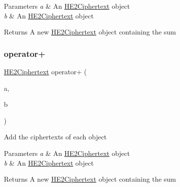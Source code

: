 \begin{DoxyParams}{Parameters}
{\em a} & An {\ttfamily \hyperlink{classHE2Ciphertext}{H\+E2\+Ciphertext}} object \\
\hline
{\em b} & An {\ttfamily \hyperlink{classHE2Ciphertext}{H\+E2\+Ciphertext}} object \\
\hline
\end{DoxyParams}
\begin{DoxyReturn}{Returns}
A new {\ttfamily \hyperlink{classHE2Ciphertext}{H\+E2\+Ciphertext}} object containing the sum 
\end{DoxyReturn}
\mbox{\label{classHE2Ciphertext_af90fd206e69fa74b30d40f41f707bdb8}} 
\subsubsection{\texorpdfstring{operator+}{operator+}}
{\footnotesize\ttfamily \hyperlink{classHE2Ciphertext}{H\+E2\+Ciphertext} operator+ (\begin{DoxyParamCaption}\item[{const \hyperlink{classHE2Ciphertext}{H\+E2\+Ciphertext} \&}]{a,  }\item[{const \hyperlink{classHE2Ciphertext}{H\+E2\+Ciphertext} \&}]{b }\end{DoxyParamCaption})\hspace{0.3cm}{\ttfamily [friend]}}

Add the {\ttfamily ciphertexts} of each object 
\begin{DoxyParams}{Parameters}
{\em a} & An {\ttfamily \hyperlink{classHE2Ciphertext}{H\+E2\+Ciphertext}} object \\
\hline
{\em b} & An {\ttfamily \hyperlink{classHE2Ciphertext}{H\+E2\+Ciphertext}} object \\
\hline
\end{DoxyParams}
\begin{DoxyReturn}{Returns}
A new {\ttfamily \hyperlink{classHE2Ciphertext}{H\+E2\+Ciphertext}} object containing the sum 
\end{DoxyReturn}
\mbox{\label{classHE2Ciphertext_a5d9b4ffb87a447db8b95de9c64401e0f}} 
